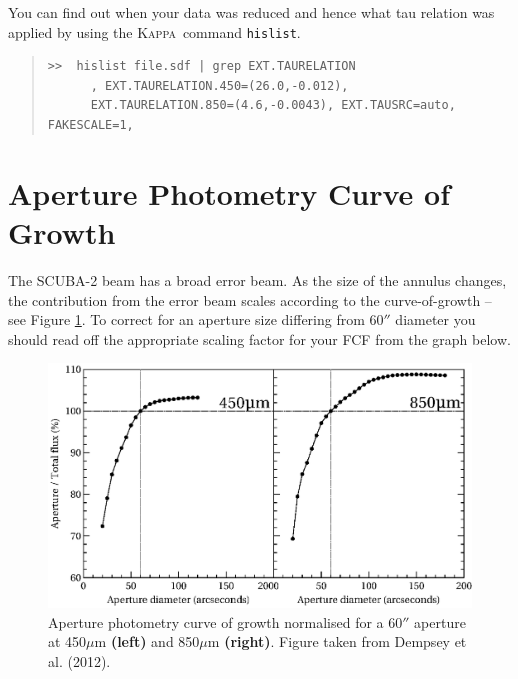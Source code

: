 \documentclass[twoside,11pt]{article}
\newcommand{\xref}[3]{#1}
\newcommand{\xlabel}[1]{}
\renewcommand{\_}{\texttt{\symbol{95}}}
\newenvironment{myquote}{\begin{quote}\begin{small}}{\end{small}\end{quote}}
\newcommand{\Kappa}{\xref{\textsc{Kappa}}{sun95}{}}
\begin{document}
You can find out when your data was reduced and hence what tau relation was applied by using the \Kappa\ command \texttt{hislist}.
\vspace{-2mm}
\begin{myquote}
\begin{verbatim}
>>  hislist file.sdf | grep EXT.TAURELATION
      , EXT.TAURELATION.450=(26.0,-0.012),
      EXT.TAURELATION.850=(4.6,-0.0043), EXT.TAUSRC=auto, FAKESCALE=1,
\end{verbatim}
\end{myquote}

\section{\xlabel{fcfsred}Aperture Photometry Curve of Growth}
\label{app:cog}
The SCUBA-2 beam has a broad error beam. As the size of the annulus changes, the contribution from the error beam scales according to the curve-of-growth -- see Figure \ref{fig:cog}. To correct for an aperture size differing from 60$''$ diameter you should read off the appropriate scaling factor  for your FCF from the graph below.


\begin{figure}[h!]
\centering
\includegraphics[width=0.95\linewidth]{curveofgrowth}
\caption{\small Aperture photometry curve of growth normalised for a 60$''$ aperture at 450$\mu$m \textbf{(left)} and 850$\mu$m \textbf{(right)}. Figure taken from Dempsey et al. (2012).}
\label{fig:cog}
\end{figure}
\end{document}
